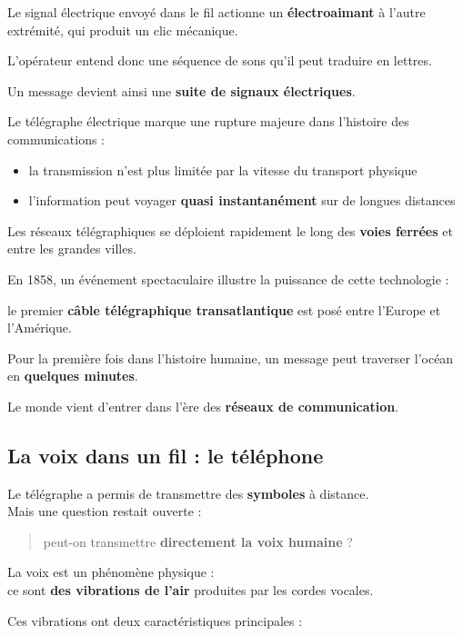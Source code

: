 \documentclass[
  french,
]{article}
\providecommand{\tightlist}{%
  \setlength{\itemsep}{0pt}\setlength{\parskip}{0pt}}
\begin{document}
Le signal électrique envoyé dans le fil actionne un
\textbf{électroaimant} à l'autre extrémité, qui produit un clic
mécanique.

L'opérateur entend donc une séquence de sons qu'il peut traduire en
lettres.

Un message devient ainsi une \textbf{suite de signaux électriques}.

Le télégraphe électrique marque une rupture majeure dans l'histoire des
communications :

\begin{itemize}
\tightlist
\item
  la transmission n'est plus limitée par la vitesse du transport
  physique
\item
  l'information peut voyager \textbf{quasi instantanément} sur de
  longues distances
\end{itemize}

Les réseaux télégraphiques se déploient rapidement le long des
\textbf{voies ferrées} et entre les grandes villes.

En 1858, un événement spectaculaire illustre la puissance de cette
technologie :

le premier \textbf{câble télégraphique transatlantique} est posé entre
l'Europe et l'Amérique.

Pour la première fois dans l'histoire humaine, un message peut traverser
l'océan en \textbf{quelques minutes}.

Le monde vient d'entrer dans l'ère des \textbf{réseaux de
communication}.

\subsection{La voix dans un fil : le
téléphone}\label{la-voix-dans-un-fil-le-tuxe9luxe9phone}

Le télégraphe a permis de transmettre des \textbf{symboles} à
distance.\\
Mais une question restait ouverte :

\begin{quote}
peut-on transmettre \textbf{directement la voix humaine} ?
\end{quote}

La voix est un phénomène physique :\\
ce sont \textbf{des vibrations de l'air} produites par les cordes
vocales.

Ces vibrations ont deux caractéristiques principales :
\end{document}
